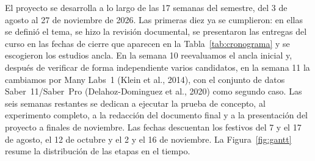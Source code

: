 \documentclass[11pt,openany,oneside,letterpaper]{book}
\begin{document}
El proyecto se desarrolla a lo largo de las 17 semanas del semestre, del 3 de agosto al 27 de noviembre de 2026. Las primeras diez ya se cumplieron: en ellas se definió el tema, se hizo la revisión documental, se presentaron las entregas del curso en las fechas de cierre que aparecen en la Tabla~\ref{tab:cronograma} y se escogieron los estudios ancla. En la semana 10 reevaluamos el ancla inicial y, después de verificar de forma independiente varios candidatos, en la semana 11 la cambiamos por Many Labs~1 (Klein et al., 2014), con el conjunto de datos Saber~11/Saber~Pro (Delahoz-Dominguez et al., 2020) como segundo caso. Las seis semanas restantes se dedican a ejecutar la prueba de concepto, al experimento completo, a la redacción del documento final y a la presentación del proyecto a finales de noviembre. Las fechas descuentan los festivos del 7 y el 17 de agosto, el 12 de octubre y el 2 y el 16 de noviembre. La Figura~\ref{fig:gantt} resume la distribución de las etapas en el tiempo.
\end{document}
